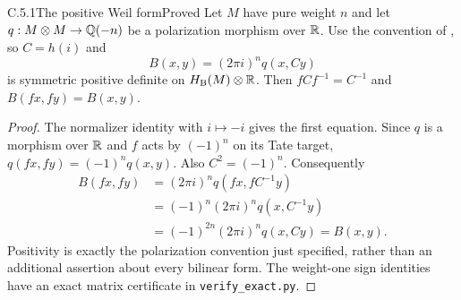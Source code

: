 \begin{result}{C.5.1}{The positive Weil form}{Proved}
Let $M$ have pure weight $n$ and let $q:M\otimes M\to\mathbb Q(-n)$ be a polarization morphism over $\mathbb R$. Use the convention of \cite[(5.4)--(5.5)]{MilneShimura}, so $C=h(i)$ and
\[
 B(x,y)=(2\pi i)^n q(x,Cy)
\]
is symmetric positive definite on $H_\mathrm B(M)\otimes\mathbb R$. Then $fCf^{-1}=C^{-1}$ and $B(fx,fy)=B(x,y)$.
\end{result}
\begin{proof}
The normalizer identity with $i\mapsto-i$ gives the first equation. Since $q$ is a morphism over $\mathbb R$ and $f$ acts by $(-1)^n$ on its Tate target, $q(fx,fy)=(-1)^nq(x,y)$. Also $C^2=(-1)^n$. Consequently
\[
 \begin{aligned}
 B(fx,fy)
 &=(2\pi i)^nq(fx,fC^{-1}y)\\
 &=(-1)^n(2\pi i)^nq(x,C^{-1}y)\\
 &=(-1)^{2n}(2\pi i)^nq(x,Cy)=B(x,y).
 \end{aligned}
\]
Positivity is exactly the polarization convention just specified, rather than an additional assertion about every bilinear form. The weight-one sign identities have an exact matrix certificate in \texttt{verify\_exact.py}.
\end{proof}
